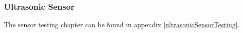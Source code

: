 \subsubsection{Ultrasonic Sensor} \label{Analysis:ultrasonicTests}
The sensor testing chapter can be found in appendix \ref{ultrasonicSensorTesting}.
